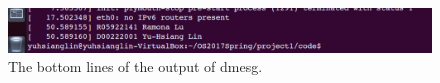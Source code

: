 \documentclass[twoside, 11pt, tablecaption=bottom]{article}
\begin{document}
\begin{figure}
\centering
\includegraphics[width = 15 cm]{dmesg}
\caption{The bottom lines of the output of dmesg.}
\label{fig:dmesg}
\end{figure}






\vskip 0.2in
%
\end{document}

